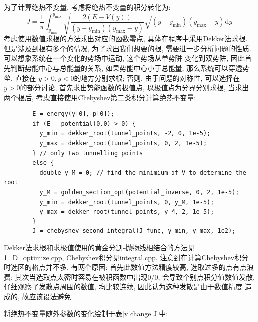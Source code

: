 \documentclass[a4paper,zihao=5,UTF8]{ctexart}
\def\d{\mathrm{d}}
\newcommand{\mr}[1]{\mathrm{#1}}
\begin{document}
    \par 
    为了计算绝热不变量, 考虑将绝热不变量的积分转化为:
    \begin{equation}
        J = \frac{1}{\pi}\int_{y_{\mr{min}}}^{y_{\mr{max}}}\sqrt{\frac{2(E - V(y))}{(y - y_{\mr{min}})(y_{\mr{max}} - y)}}
        \sqrt{(y - y_{\mr{min}})(y_{\mr{max}} - y)} \d y
    \end{equation}
    考虑使用数值求根的方法求出对应的函数零点, 具体在程序中采用Dekker法求根. 但是涉及到根有多个的情况, 
    为了求出我们想要的根, 需要进一步分析问题的性质. 可以想象系统在一个变化的势场中运动, 这个势场从单势阱
    变化到双势阱, 因此首先判断势能中心与总能量的关系, 如果势能中心小于总能量, 那么系统可以穿透势垒, 直接在
    $y>0,y<0$的地方分别求根; 否则, 由于问题的对称性, 可以选择在$y>0$的部分讨论, 首先求出势能函数的极值点,
    以极值点为分界分别求根, 当求出两个根后, 考虑直接使用Chebyshev第二类积分计算绝热不变量:
    \begin{lstlisting}
        E = energy(y[0], p[0]);
        if (E - potential(0.0) > 0) {
          y_min = dekker_root(tunnel_points, -2, 0, 1e-5);
          y_max = dekker_root(tunnel_points, 0, 2, 1e-5);
        } // only two tunnelling points
        else {
          double y_M = 0; // find the minimium of V to determine the root
          y_M = golden_section_opt(potential_inverse, 0, 2, 1e-5);
          y_min = dekker_root(tunnel_points, 0, y_M, 1e-5);
          y_max = dekker_root(tunnel_points, y_M, 2, 1e-5);
        }
        J = chebyshev_second_integral(J_func, y_min, y_max, 1e2);
    \end{lstlisting}
    Dekker法求根和求极值使用的黄金分割-抛物线相结合的方法见1\_D\_optimize.cpp,
     Chebyshev积分见integral.cpp. 注意到在计算Chebyshev积分时选区的格点并不多, 有两个原因: 
     首先此数值方法精度较高, 选取过多的点有点浪费; 其次当选取点太密时容易在被积函数中出现0/0,
     会导致个别点积分值数值发散, 仔细观察了发散点周围的数值, 均比较连续, 因此认为这种发散是由于数值精度
     造成的, 故应该设法避免.
     \par 
     将绝热不变量随外参数的变化绘制于表\ref{v change J}中:
\end{document}
